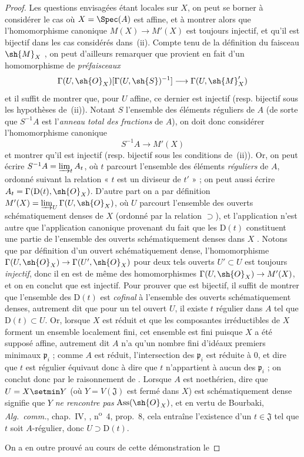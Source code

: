 \begin{proof}
Les questions envisagées étant locales sur $X$, on peut se borner à considérer le cas où $X=\Spec(A)$ est affine, et à montrer alors que l'homomorphisme canonique $M(X)\to M'(X)$ est toujours injectif, et qu'il est bijectif dans les cas considérés dans~(ii).
Compte tenu de la définition du faisceau $\sh{M}_X$ , on peut d'ailleurs remarquer que  provient en fait d'un homomorphisme de \emph{préfaisceaux}
\[
  \Gamma(U,\sh{O}_X)[\Gamma(U,\sh{S})^{-1}]\to\Gamma(U,\sh{M}'_X)
\]
et il suffit de montrer que, pour $U$ affine, ce dernier est injectif (resp. bijectif sous les hypothèses de~(ii)).
Notant $S$ l'ensemble des éléments réguliers de $A$ (de sorte que $S^{-1}A$ est l'\emph{anneau total des fractions} de $A$), on doit donc considérer l'homomorphisme canonique
\[
\label{IV.20.2.11.1}
  S^{-1}A\to M'(X)
  \tag{20.2.11.1}
\]
et montrer qu'il est injectif (resp. bijectif sous les conditions de~(ii)).
Or, on peut écrire $S^{-1}A=\varinjlim_t A_t$, où $t$ parcourt l'ensemble des éléments \emph{réguliers} de $A$, ordonné suivant la relation « $t$ est un diviseur de $t'$ »  ; on peut aussi écrire $A_t=\Gamma(\mathrm{D}(t),\sh{O}_X)$.
D'autre part on a par définition $M'(X)=\varinjlim_U\Gamma(U,\sh{O}_X)$, où $U$ parcourt l'ensemble des ouverts schématiquement denses de $X$ (ordonné par la relation $\supset$), et l'application  n'est autre que l'application canonique provenant du fait que les $\mathrm{D}(t)$ constituent une partie de l'ensemble des ouverts schématiquement denses dans $X$ .
Notons que par définition d'un ouvert schématiquement dense, l'homomorphisme $\Gamma(U,\sh{O}_X)\to\Gamma(U',\sh{O}_X)$ pour deux tels ouverts $U'\subset U$ est toujours \emph{injectif}, donc il en est de même des homomorphismes $\Gamma(U,\sh{O}_X)\to M'(X)$, et on en conclut que  est injectif.
Pour prouver que  est bijectif, il suffit de montrer que l'ensemble des $\mathrm{D}(t)$ est \emph{cofinal} à l'ensemble des ouverts schématiquement denses, autrement dit que pour un tel ouvert $U$, il existe $t$ régulier dans $A$ tel que $\mathrm{D}(t)\subset U$.
Or, lorsque $X$ est réduit et que les composantes irréductibles de $X$ forment un ensemble localement fini, cet ensemble est fini puisque $X$ a été supposé affine, autrement dit $A$ n'a qu'un nombre fini d'idéaux premiers minimaux $\mathfrak{p}_i$ ; comme $A$ est réduit, l'intersection des $\mathfrak{p}_i$ est réduite à $0$, et dire que $t$ est régulier équivaut donc à dire que $t$ n'appartient à aucun des $\mathfrak{p}_i$ ; on conclut donc par le raisonnement de .
Lorsque $A$ est noethérien, dire que $U=X\setmin Y$ (où $Y=V(\mathfrak{J})$ est fermé dans $X$) est schématiquement dense signifie  que $Y$ \emph{ne rencontre pas} $\operatorname{Ass}(\sh{O}_X)$, et en vertu de Bourbaki, \emph{Alg.~comm.}, chap.~IV, , n\textsuperscript{o}~4, prop.~8, cela entraîne l'existence d'un $t\in\mathfrak{J}$ tel que $t$ soit $A$-régulier, donc $U\supset\mathrm{D}(t)$.

On a en outre prouvé au cours de cette démonstration le
\end{proof}

